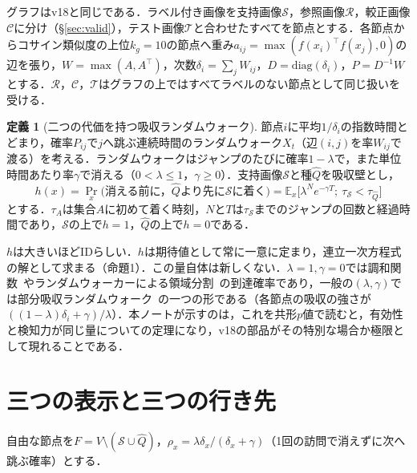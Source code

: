 \documentclass[a4paper,10pt,dvipdfmx]{jsarticle}
\theoremstyle{definition}
\newtheorem{definition}{定義}
\newcommand{\cS}{\mathcal{S}}
\newcommand{\cR}{\mathcal{R}}
\newcommand{\cC}{\mathcal{C}}
\newcommand{\cT}{\mathcal{T}}
\newcommand{\hQ}{\hat{Q}}
\newcommand{\E}{\mathbb{E}}
\begin{document}
グラフはv18と同じである．ラベル付き画像を支持画像$\cS$，参照画像$\cR$，較正画像$\cC$に分け（\S\ref{sec:valid}），テスト画像$\cT$と合わせたすべてを節点とする．各節点からコサイン類似度の上位$k_g{=}10$の節点へ重み$a_{ij}=\max(f(x_i)^{\top}f(x_j),0)$の辺を張り，$W=\max(A,A^{\top})$，次数$\delta_i=\sum_jW_{ij}$，$D=\mathrm{diag}(\delta_i)$，$P=D^{-1}W$とする．$\cR$，$\cC$，$\cT$はグラフの上ではすべてラベルのない節点として同じ扱いを受ける．

\begin{definition}[二つの代価を持つ吸収ランダムウォーク]
節点$i$に平均$1/\delta_i$の指数時間とどまり，確率$P_{ij}$で$j$へ跳ぶ連続時間のランダムウォーク$X_t$（辺$(i,j)$を率$W_{ij}$で渡る）を考える．ランダムウォークはジャンプのたびに確率$1-\lambda$で，また単位時間あたり率$\gamma$で消える（$0<\lambda\le1$，$\gamma\ge0$）．支持画像$\cS$と種$\hQ$を吸収壁とし，
\begin{equation}
h(x)=\Pr_x\big(\text{消える前に，}\hQ\text{より先に}\cS\text{に着く}\big)=\E_x\big[\lambda^{N}e^{-\gamma T};\ \tau_{\cS}<\tau_{\hQ}\big]
\label{eq:h}
\end{equation}
とする．$\tau_A$は集合$A$に初めて着く時刻，$N$と$T$は$\tau_{\cS}$までのジャンプの回数と経過時間であり，$\cS$の上で$h=1$，$\hQ$の上で$h=0$である．
\end{definition}

$h$は大きいほどIDらしい．$h$は期待値として常に一意に定まり，連立一次方程式の解として求まる（命題1）．この量自体は新しくない．$\lambda{=}1,\gamma{=}0$では調和関数~\cite{zhu2003harmonic}やランダムウォーカーによる領域分割~\cite{grady2006rw}の到達確率であり，一般の$(\lambda,\gamma)$では部分吸収ランダムウォーク~\cite{wu2012parw}の一つの形である（各節点の吸収の強さが$((1-\lambda)\delta_i+\gamma)/\lambda$）．本ノートが示すのは，これを共形$p$値で読むと，有効性と検知力が同じ量についての定理になり，v18の部品がその特別な場合か極限として現れることである．

\section{三つの表示と三つの行き先}
\label{sec:faces}
自由な節点を$F=V\setminus(\cS\cup\hQ)$，$\rho_x=\lambda\delta_x/(\delta_x+\gamma)$（1回の訪問で消えずに次へ跳ぶ確率）とする．
\end{document}
